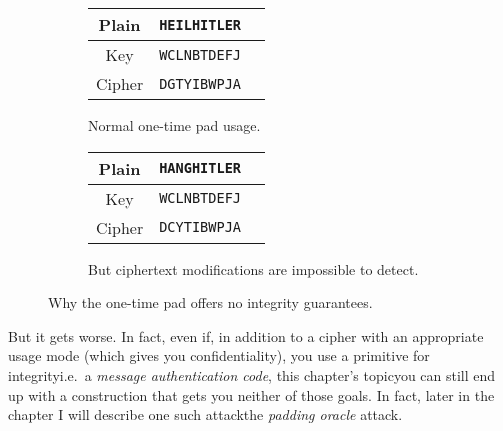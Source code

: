   \begin{figure}[!htb]
    \centering
    \renewcommand{\arraystretch}{1.2} %
    \begin{subfigure}{0.5\textwidth}
      \centering
      \begin{tabular}{c | c | c}
        Plain & \verb+HEILHITLER+ \\
        \hline
        Key & \verb+WCLNBTDEFJ+ \\
        \hline
        Cipher & \verb+DGTYIBWPJA+
      \end{tabular}
      \captionsetup{width=0.95\linewidth}
      \caption{Normal one-time pad usage.\vspace{1em}}\label{tab:otp_originally}
    \end{subfigure}%
    \begin{subfigure}{0.5\textwidth}
      \centering
      \begin{tabular}{c | c | c}
        Plain & \verb+H+{\color{red}\verb+ANG+}\verb+HITLER+\\
        \hline
        Key & \texttt{WCLNBTDEFJ} \\
        \hline
        Cipher & \verb+D+{\color{red}\verb+CYT+}\verb+IBWPJA+\\
      \end{tabular}
      \captionsetup{width=0.95\linewidth}
      \caption{But ciphertext modifications are impossible to detect.}\label{tab:otp_modified}
    \end{subfigure}
    \caption{Why the one-time pad offers no integrity guarantees.}\label{tab:otp_no_integrity}
  \end{figure}
  \noindent But it gets worse. In fact, even if, in addition to a cipher with an appropriate usage mode (which gives you confidentiality), you use a primitive for integrity\emd i.e.\ a \emph{message authentication code}, this chapter's topic\emd you can still end up with a construction that gets you neither of those goals. In fact, later in the chapter I will describe one such attack\emd the \emph{padding oracle} attack.

